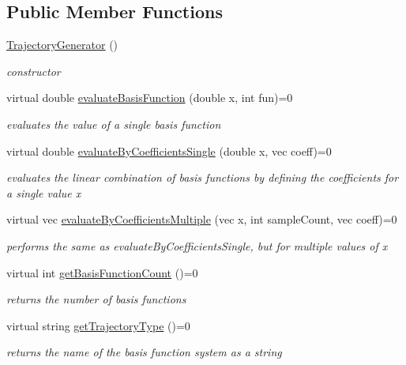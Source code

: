 \subsection*{\-Public \-Member \-Functions}
\begin{DoxyCompactItemize}
\item 
\hyperlink{classTrajectoryGenerator_af1358bd5e8dad73dbf2b46bf8c0a54a9}{\-Trajectory\-Generator} ()
\begin{DoxyCompactList}\small\item\em constructor \end{DoxyCompactList}\item 
virtual double \hyperlink{classTrajectoryGenerator_a2f2305b2cb435b0fa7685937516022e1}{evaluate\-Basis\-Function} (double x, int fun)=0
\begin{DoxyCompactList}\small\item\em evaluates the value of a single basis function \end{DoxyCompactList}\item 
virtual double \hyperlink{classTrajectoryGenerator_adcc7ede9c713112796a9fc9f1bf4fec2}{evaluate\-By\-Coefficients\-Single} (double x, vec coeff)=0
\begin{DoxyCompactList}\small\item\em evaluates the linear combination of basis functions by defining the coefficients for a single value x \end{DoxyCompactList}\item 
virtual vec \hyperlink{classTrajectoryGenerator_a015de9be72b70ce71675069f4b3361c2}{evaluate\-By\-Coefficients\-Multiple} (vec x, int sample\-Count, vec coeff)=0
\begin{DoxyCompactList}\small\item\em performs the same as evaluate\-By\-Coefficients\-Single, but for multiple values of x \end{DoxyCompactList}\item 
virtual int \hyperlink{classTrajectoryGenerator_a8d3c339d0c8488873074c8bce918afae}{get\-Basis\-Function\-Count} ()=0
\begin{DoxyCompactList}\small\item\em returns the number of basis functions \end{DoxyCompactList}\item 
virtual string \hyperlink{classTrajectoryGenerator_a14e3b583fcee58d393360ef0eb0fb71c}{get\-Trajectory\-Type} ()=0
\begin{DoxyCompactList}\small\item\em returns the name of the basis function system as a string \end{DoxyCompactList}\end{DoxyCompactItemize}


